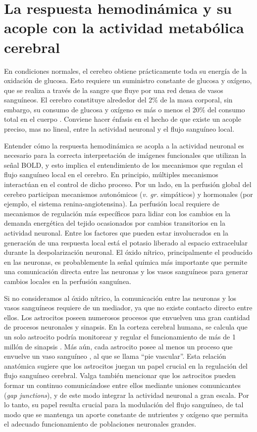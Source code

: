 \section{La respuesta hemodinámica y su acople con la actividad metabólica cerebral}
En condiciones normales, el cerebro obtiene prácticamente toda su energía de la oxidación de glucosa. Esto requiere un suministro constante de glucosa y oxígeno, que se realiza a través de la sangre que fluye por una red densa de vasos sanguíneos. El cerebro constituye alrededor del 2\% de la masa corporal, sin embargo, su consumo de glucosa y oxígeno es más o menos el 20\% del consumo total en el cuerpo \cite{A2001}. Conviene hacer énfasis en el hecho de que existe un acople preciso, mas no lineal, entre la actividad neuronal y el flujo sanguíneo local.

Entender cómo la respuesta hemodinámica se acopla a la actividad neuronal es necesario para la correcta interpretación de imágenes funcionales que utilizan la señal BOLD, y esto implica el entendimiento de los mecanismos que regulan el flujo sanguíneo local en el cerebro. En principio, múltiples mecanismos interactúan en el control de dicho proceso. Por un lado, en la perfusión global del cerebro participan mecanismos autonómicos (\emph{v. gr.} simpáticos)  y hormonales (por ejemplo, el sistema renina-angiotensina). La perfusión local requiere de mecanismos de regulación más específicos para lidiar con los cambios en la demanda energética del tejido ocasionados por cambios transitorios en la actividad neuronal. Entre los factores que pueden estar involucrados en la generación de una respuesta local está el potasio liberado al espacio extracelular durante la despolarización neuronal. El óxido nítrico, principalmente  el producido en las neuronas, es probablemente la señal química más importante que permite una comunicación directa entre las neuronas y los vasos sanguíneos para generar cambios locales en la perfusión sanguínea.

Si no consideramos al óxido nítrico, la comunicación entre las neuronas y los vasos sanguíneos requiere de un mediador, ya que no existe contacto directo entre ellos. Los astrocitos poseen numerosos procesos que envuelven una gran cantidad de procesos neuronales y sinapsis. En la corteza cerebral humana, se calcula que un solo astrocito podría monitorear y regular el funcionamiento de más de 1 millón de sinapsis \cite{OberheimNA2006}. Más aún, cada astrocito posee al menos un proceso que envuelve un vaso sanguíneo \cite{SimardM2003}, al que se llama ``pie vascular''. Esta relación anatómica sugiere que los astrocitos juegan un papel crucial en la regulación del flujo sanguíneo cerebral. Valga también mencionar que los astrocitos pueden formar un continuo comunicándose entre ellos mediante uniones comunicantes (\emph{gap junctions}), y de este modo integrar la actividad neuronal a gran escala. Por lo tanto, su papel resulta crucial para la modulación del flujo sanguíneo, de tal modo que se mantenga un aporte constante de nutrientes y oxígeno que permita el adecuado funcionamiento de poblaciones neuronales grandes.


